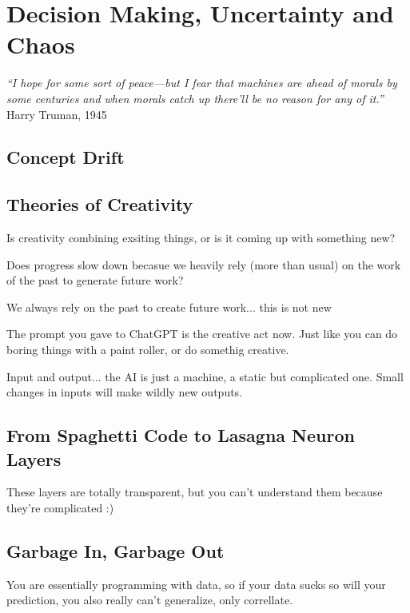 \setchapterpreamble[u]{\margintoc}
\chapter{Decision Making, Uncertainty and Chaos}

\textit{“I hope for some sort of peace—but I fear that machines are ahead of morals by some centuries and when morals catch up there'll be no reason for any of it.”} Harry Truman, 1945 \cite{McCullough1992}



\section{Concept Drift}

\section{Theories of Creativity}

Is creativity combining exsiting things, or is it coming up with something new?

Does progress slow down becasue we heavily rely (more than usual) on the work of the past to generate future work?

We always rely on the past to create future work... this is not new

The prompt you gave to ChatGPT is the creative act now. Just like you can do boring things with a paint roller, or do somethig creative.

Input and output... the AI is just a machine, a static but complicated one. Small changes in inputs will make wildly new outputs.

\section{From Spaghetti Code to Lasagna Neuron Layers}

These layers are totally transparent, but you can't understand them because they're complicated :)

\section{Garbage In, Garbage Out}

You are essentially programming with data, so if your data sucks so will your prediction, you also really can't generalize, only correllate.

